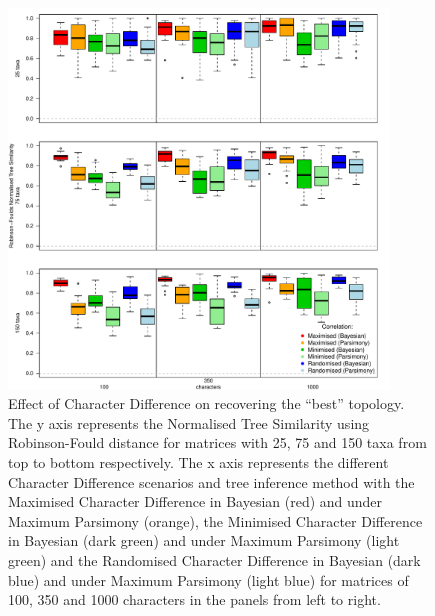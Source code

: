 \documentclass[12pt,letterpaper]{article}
\begin{document}
\begin{figure}[!htbp]
\centering
   \includegraphics[width=0.9\textwidth]{Figures/RF_results_best.pdf} %
\caption{Effect of Character Difference on recovering the ``best'' topology. The y axis represents the Normalised Tree Similarity using Robinson-Fould distance for matrices with 25, 75 and 150 taxa from top to bottom respectively. The x axis represents the different Character Difference scenarios and tree inference method with the Maximised Character Difference in Bayesian (red) and under Maximum Parsimony (orange), the Minimised Character Difference in Bayesian (dark green) and under Maximum Parsimony (light green) and the Randomised Character Difference in Bayesian (dark blue) and under Maximum Parsimony (light blue) for matrices of 100, 350 and 1000 characters in the panels from left to right.}
\label{Fig:RF_results_best}
\end{figure}
\end{document}
